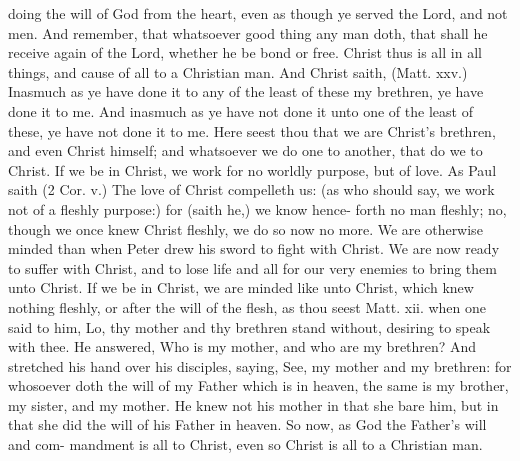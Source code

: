 \documentclass{custom}
\begin{document}
doing the will of God from the heart, even as though ye 
served the Lord, and not men. And remember, that 
whatsoever good thing any man doth, that shall he receive 
again of the Lord, whether he be bond or free. Christ 
thus is all in all things, and cause of all to a Christian man. 
And Christ saith, (Matt. xxv.) Inasmuch as ye have done 
it to any of the least of these my brethren, ye have done 
it to me. And inasmuch as ye have not done it unto one 
of the least of these, ye have not done it to me. Here 
seest thou that we are Christ's brethren, and even Christ 
himself; and whatsoever we do one to another, that do we 
to Christ. If we be in Christ, we work for no worldly 
purpose, but of love. As Paul saith (2 Cor. v.) The love 
of Christ compelleth us: (as who should say, we work 
not of a fleshly purpose:) for (saith he,) we know hence- 
forth no man fleshly; no, though we once knew Christ 
fleshly, we do so now no more. We are otherwise minded 
than when Peter drew his sword to fight with Christ. We 
are now ready to suffer with Christ, and to lose life and 
all for our very enemies to bring them unto Christ. If we 
be in Christ, we are minded like unto Christ, which knew 
nothing fleshly, or after the will of the flesh, as thou seest 
Matt. xii. when one said to him, Lo, thy mother and thy 
brethren stand without, desiring to speak with thee. He 
answered, Who is my mother, and who are my brethren? 
And stretched his hand over his disciples, saying, See, my 
mother and my brethren: for whosoever doth the will of 
my Father which is in heaven, the same is my brother, my 
sister, and my mother. He knew not his mother in that 
she bare him, but in that she did the will of his Father in 
heaven. So now, as God the Father's will and com- 
mandment is all to Christ, even so Christ is all to a 
Christian man. 
\end{document}
